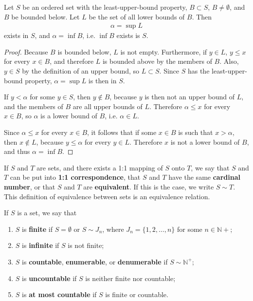 \documentclass[12pt]{article}
\begin{document}
\begin{thm}
  Let $S$ be an ordered set with the least-upper-bound property, $B \subset S$, $B
  \neq \emptyset$, and $B$ be bounded below. Let $L$ be the set of all lower bounds
  of $B$. Then
  \begin{align*}
    \alpha = \sup L
  \end{align*}
  exists in $S$, and $\alpha = \inf B$, i.e. $\inf B$ exists is $S$.

  \begin{proof}
    Because $B$ is bounded below, $L$ is not empty. Furthermore, if $y \in L$, $y
    \leq x$ for every $x \in B$, and therefore $L$ is bounded above by the members of
    $B$. Also, $y \in S$ by the definition of an upper bound, so $L \subset S$. Since
    $S$ has the least-upper-bound property, $\alpha = \sup L$ is then in $S$.

    If $y < \alpha$ for some $y \in S$, then $y \notin B$, because $y$ is then not an
    upper bound of $L$, and the members of $B$ are all upper bounds of $L$. Therefore
    $\alpha \leq x$ for every $x \in B$, so $\alpha$ is a lower bound of $B$, i.e.
    $\alpha \in L$.

    Since $\alpha \leq x$ for every $x \in B$, it follows that if some $x \in B$ is
    such that $x > \alpha$, then $x \notin L$, because $y \leq \alpha$ for every $y
    \in L$. Therefore $x$ is not a lower bound of $B$, and thus $\alpha = \inf B$.
  \end{proof}
\end{thm}

\begin{defn}
  If $S$ and $T$ are sets, and there exists a 1:1 mapping of $S$ onto $T$, we say
  that $S$ and $T$ can be put into \textbf{1:1 correspondence}, that $S$ and $T$ have
  the same \textbf{cardinal number}, or that $S$ and $T$ are \textbf{equivalent}. If
  this is the case, we write $S \sim T$. This definition of equivalence between sets
  is an equivalence relation.
\end{defn}

\begin{defn}
  If $S$ is a set, we say that
  \begin{enumerate}
    \item
      $S$ is \textbf{finite} if $S = \emptyset$ or $S \sim J_n$, where $J_n =
      \{1,2,\ldots,n\}$ for some $n \in \mathbb{N}+$;
    \item
      $S$ is \textbf{infinite} if $S$ is not finite;
    \item
      $S$ is \textbf{countable}, \textbf{enumerable}, or \textbf{denumerable} if $S
      \sim \mathbb{N}^+$;
    \item
      $S$ is \textbf{uncountable} if $S$ is neither finite nor countable;
    \item
      $S$ is \textbf{at most countable} if $S$ is finite or countable.
  \end{enumerate}
\end{defn}
\end{document}
